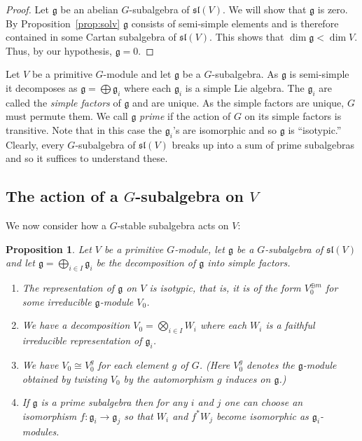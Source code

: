 \documentclass{amsart}
\newtheorem{proposition}[theorem]{Proposition}
\theoremstyle{definition}
\theoremstyle{remark}
\let\mf\mathfrak
\begin{document}
\begin{proof}
Let $\mf{g}$ be an abelian $G$-subalgebra of $\mf{sl}(V)$.  We will show that $\mf{g}$ is zero.  By
Proposition~\ref{prop:solv} $\mf{g}$ consists of semi-simple elements and is therefore contained in some Cartan
subalgebra of $\mf{sl}(V)$.  This shows that $\dim{\mf{g}} < \dim{V}$.  Thus, by our hypothesis, $\mf{g}=0$.
\end{proof}

Let $V$ be a primitive $G$-module and let $\mf{g}$ be a $G$-subalgebra.  As $\mf{g}$ is semi-simple it decomposes as
$\mf{g}=\bigoplus \mf{g}_i$ where each $\mf{g}_i$ is a simple Lie algebra.  The $\mf{g}_i$ are called the \emph{simple
factors} of $\mf{g}$ and are unique.  As the simple factors are unique, $G$ must permute them.  We call $\mf{g}$
\emph{prime} if the action of $G$ on its simple factors is transitive.  Note that in this case the $\mf{g}_i$'s are
isomorphic and so $\mf{g}$ is ``isotypic.''  Clearly, every $G$-subalgebra of $\mf{sl}(V)$ breaks up into a sum of prime
subalgebras and so it suffices to understand these.


\subsection{The action of a $G$-subalgebra on $V$}

We now consider how a $G$-stable subalgebra acts on $V$:

\begin{proposition}
\label{prop:iso}
Let $V$ be a primitive $G$-module, let $\mf{g}$ be a $G$-subalgebra of $\mf{sl}(V)$ and let $\mf{g}=\bigoplus_{i \in I}
\mf{g}_i$ be the decomposition of $\mf{g}$ into simple factors.
\begin{enumerate}
\item The representation of $\mf{g}$ on $V$ is isotypic, that is, it is of the form $V_0^{\oplus m}$ for some
irreducible $\mf{g}$-module $V_0$.
\item We have a decomposition $V_0=\bigotimes_{i \in I} W_i$ where each $W_i$ is a faithful irreducible representation
of $\mf{g}_i$.
\item We have $V_0 \cong V_0^g$ for each element $g$ of $G$.  (Here $V_0^g$ denotes the $\mf{g}$-module obtained by
twisting $V_0$ by the automorphism $g$ induces on $\mf{g}$.)
\item If $\mf{g}$ is a prime subalgebra then for any $i$ and $j$ one can choose an isomorphism $f:\mf{g}_i \to \mf{g}_j$
so that $W_i$ and $f^* W_j$ become isomorphic as $\mf{g}_i$-modules.
\end{enumerate}
\end{proposition}
\end{document}
